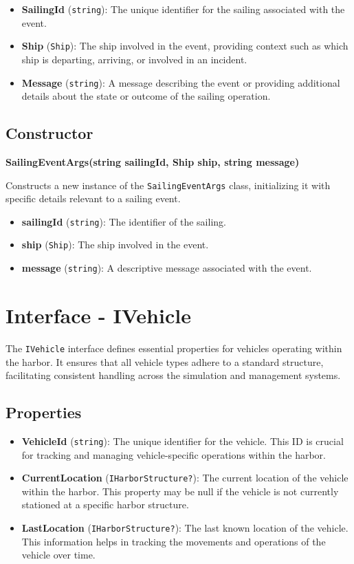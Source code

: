 \documentclass[12pt]{article}
\begin{document}
\begin{itemize}
    \item \textbf{SailingId} (\texttt{string}): The unique identifier for the sailing associated with the event.
    \item \textbf{Ship} (\texttt{Ship}): The ship involved in the event, providing context such as which ship is departing, arriving, or involved in an incident.
    \item \textbf{Message} (\texttt{string}): A message describing the event or providing additional details about the state or outcome of the sailing operation.
\end{itemize}

\subsection*{Constructor}

\textbf{SailingEventArgs(string sailingId, Ship ship, string message)}

Constructs a new instance of the \texttt{SailingEventArgs} class, initializing it with specific details relevant to a sailing event.

\begin{itemize}
    \item \textbf{sailingId} (\texttt{string}): The identifier of the sailing.
    \item \textbf{ship} (\texttt{Ship}): The ship involved in the event.
    \item \textbf{message} (\texttt{string}): A descriptive message associated with the event.
\end{itemize}

\newpage
\section*{Interface - IVehicle}

The \texttt{IVehicle} interface defines essential properties for vehicles operating within the harbor. It ensures that all vehicle types adhere to a standard structure, facilitating consistent handling across the simulation and management systems.

\subsection*{Properties}

\begin{itemize}
    \item \textbf{VehicleId} (\texttt{string}): The unique identifier for the vehicle. This ID is crucial for tracking and managing vehicle-specific operations within the harbor.
    \item \textbf{CurrentLocation} (\texttt{IHarborStructure?}): The current location of the vehicle within the harbor. This property may be null if the vehicle is not currently stationed at a specific harbor structure.
    \item \textbf{LastLocation} (\texttt{IHarborStructure?}): The last known location of the vehicle. This information helps in tracking the movements and operations of the vehicle over time.
\end{itemize}
\end{document}

